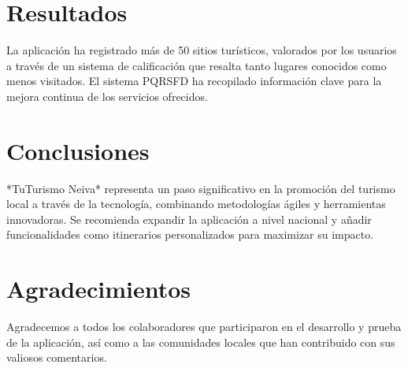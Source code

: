 \documentclass[conference]{IEEEtran}
\begin{document}
\section{Resultados}
La aplicación ha registrado más de 50 sitios turísticos, valorados por los usuarios a través de un sistema de calificación que resalta tanto lugares conocidos como menos visitados. El sistema PQRSFD ha recopilado información clave para la mejora continua de los servicios ofrecidos.

\section{Conclusiones}
*TuTurismo Neiva* representa un paso significativo en la promoción del turismo local a través de la tecnología, combinando metodologías ágiles y herramientas innovadoras. Se recomienda expandir la aplicación a nivel nacional y añadir funcionalidades como itinerarios personalizados para maximizar su impacto.

\section*{Agradecimientos}
Agradecemos a todos los colaboradores que participaron en el desarrollo y prueba de la aplicación, así como a las comunidades locales que han contribuido con sus valiosos comentarios.
\end{document}
